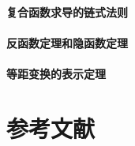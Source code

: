 \documentclass[zihao=-4,linespread=1.5,heading=true,a4paper,twoside]{ctexart}
\theoremstyle{definition}
\theoremstyle{plain}
\begin{document}
\subsection{复合函数求导的链式法则}


\subsection{反函数定理和隐函数定理}


\subsection{等距变换的表示定理}


%



\newpage\part*{参考文献}
\printbibliography[heading=none]
\end{document}

